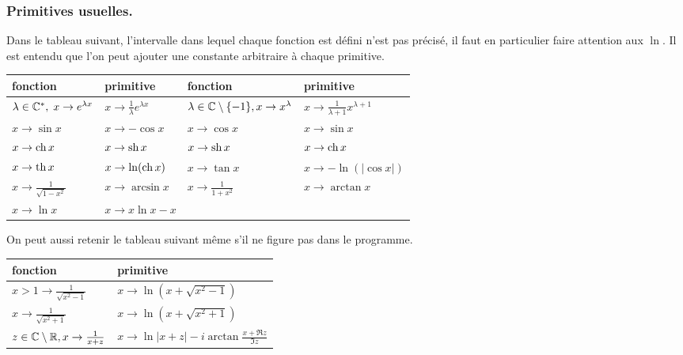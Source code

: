 \subsubsection{Primitives usuelles.} Dans le tableau suivant, l'intervalle dans lequel chaque fonction est défini n'est pas précisé, il faut en particulier faire attention aux $\ln$. Il est entendu que l'on peut ajouter une constante arbitraire à chaque primitive.
  \begin{center}
  \renewcommand{\arraystretch}{2.}
\begin{tabular}{|l|l||l|l|}
\hline
fonction & primitive & fonction & primitive \\ \hline
$\lambda\in \mathbb{C}^*,\; x\rightarrow e^{\lambda x}$             & $x\rightarrow\frac{1}{\lambda}e^{\lambda x}$ &
$\lambda \in \mathbb{C}\setminus\{-1\}, x\rightarrow x^{\lambda}$ & $x\rightarrow\frac{1}{\lambda +1}x^{\lambda + 1}$ \\ \hline
$x\rightarrow \sin x$                                       & $x\rightarrow -\cos x$ &
$x\rightarrow \cos x$                                       & $x\rightarrow \sin x$ \\ \hline
$x\rightarrow \mathop{\mathrm{ch}} x$                                        & $x\rightarrow \mathop{\mathrm{sh}} x$ &
$x\rightarrow \mathop{\mathrm{sh}} x$                                        & $x\rightarrow \mathop{\mathrm{ch}} x$ \\ \hline
$x\rightarrow \mathop{\mathrm{th}} x$                                        & $x\rightarrow \ln(\mathop{\mathrm{ch}} x)$ &
$x\rightarrow \tan x$                                       & $x\rightarrow -\ln(|\cos x|)$ \\ \hline
$x\rightarrow \frac{1}{\sqrt{1-x^2}}$                       & $x\rightarrow \arcsin x$ & 
$x\rightarrow \frac{1}{1+x^2}$                              & $x\rightarrow \arctan x$  \\ \hline
$x \rightarrow \ln x$                                       & $x\rightarrow x\ln x -x$ &
                                                            &                           \\  \hline
\end{tabular} 
  \end{center}
On peut aussi retenir le tableau suivant même s'il ne figure pas dans le programme. 
\begin{center}
  \renewcommand{\arraystretch}{2.}
\begin{tabular}{|l|l|}
\hline
fonction & primitive \\ \hline
$x > 1\rightarrow \frac{1}{\sqrt{x^2 -1}}$                & $x\rightarrow \ln\left(x +\sqrt{x^2 -1} \right) $ \\ \hline
$x \rightarrow \frac{1}{\sqrt{x^2 +1}}$                     & $x\rightarrow \ln\left(x +\sqrt{x^2 +1} \right) $ \\ \hline
$z\in \mathbb{C}\setminus \mathbb{R}, x\rightarrow \frac{1}{x + z}$   & $x\rightarrow \ln|x+z| - i\arctan\frac{x + \Re z}{\Im z} $ \\ \hline
\end{tabular}
\end{center}

